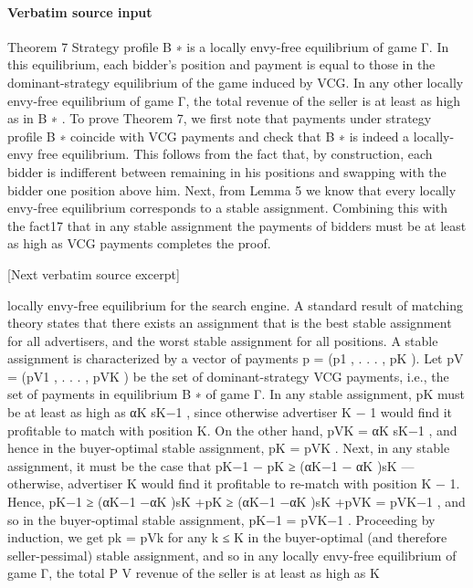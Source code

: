 \documentclass[10pt]{article}
\begin{document}
\paragraph{Verbatim source input}
\begin{ReviewVerbatim}
Theorem 7 Strategy profile B ∗ is a locally envy-free equilibrium of game Γ. In this equilibrium,
each bidder’s position and payment is equal to those in the dominant-strategy equilibrium of the
game induced by VCG. In any other locally envy-free equilibrium of game Γ, the total revenue of
the seller is at least as high as in B ∗ .
To prove Theorem 7, we first note that payments under strategy profile B ∗ coincide with VCG
payments and check that B ∗ is indeed a locally-envy free equilibrium. This follows from the fact
that, by construction, each bidder is indifferent between remaining in his positions and swapping
with the bidder one position above him. Next, from Lemma 5 we know that every locally envy-free
equilibrium corresponds to a stable assignment. Combining this with the fact17 that in any stable
assignment the payments of bidders must be at least as high as VCG payments completes the proof.

[Next verbatim source excerpt]

locally envy-free equilibrium for the search engine. A standard result of matching theory states
that there exists an assignment that is the best stable assignment for all advertisers, and the worst
stable assignment for all positions. A stable assignment is characterized by a vector of payments
p = (p1 , . . . , pK ). Let pV = (pV1 , . . . , pVK ) be the set of dominant-strategy VCG payments, i.e., the
set of payments in equilibrium B ∗ of game Γ.
In any stable assignment, pK must be at least as high as αK sK−1 , since otherwise advertiser
K − 1 would find it profitable to match with position K. On the other hand, pVK = αK sK−1 , and
hence in the buyer-optimal stable assignment, pK = pVK .
Next, in any stable assignment, it must be the case that pK−1 − pK ≥ (αK−1 − αK )sK —
otherwise, advertiser K would find it profitable to re-match with position K − 1. Hence, pK−1 ≥
(αK−1 −αK )sK +pK ≥ (αK−1 −αK )sK +pVK = pVK−1 , and so in the buyer-optimal stable assignment,
pK−1 = pVK−1 .
Proceeding by induction, we get pk = pVk for any k ≤ K in the buyer-optimal (and therefore
seller-pessimal) stable assignment, and so in any locally envy-free equilibrium of game Γ, the total
P
V
revenue of the seller is at least as high as K
\end{ReviewVerbatim}
\end{document}
